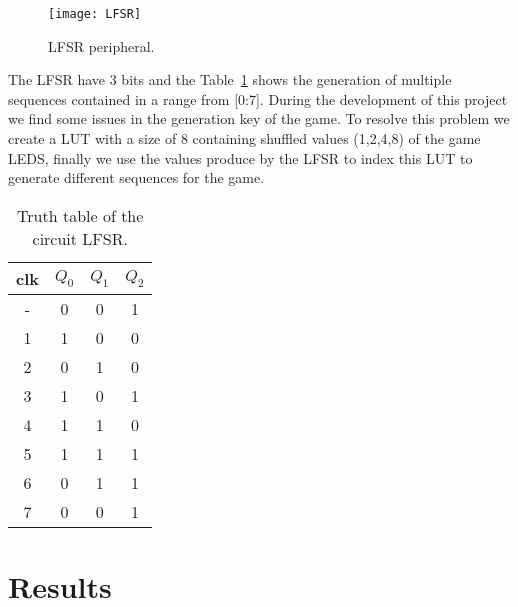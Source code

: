\vspace{10pt}
\begin{figure}[!htbp]
    \centerline{\texttt{[image: LFSR]}}
    \vspace{0cm}\caption{LFSR peripheral.}
    \label{fig:LFSR}
\end{figure}

\clearpage
\noindent The LFSR have 3 bits and the Table~\ref{tab:LFSR} shows the generation of multiple sequences contained in 
a range from [0:7]. During the development of this project we find some issues in the generation key of the game.
To resolve this problem we create a LUT with a size of 8 containing shuffled values (1,2,4,8) of the game LEDS,
finally we use the values produce by the LFSR to index this LUT to generate different sequences for the game.

\begin{table}[!htbp]
\centering
    \begin{tabular}{c|ccc}
        clk & $Q_0$ & $Q_1$ & $Q_2$ \\
        \hline
        - & 0 & 0 & 1 \\
        1 & 1 & 0 & 0 \\
        2 & 0 & 1 & 0 \\
        3 & 1 & 0 & 1 \\
        4 & 1 & 1 & 0 \\
        5 & 1 & 1 & 1 \\
        6 & 0 & 1 & 1 \\
        7 & 0 & 0 & 1 \\   
    \end{tabular}
    \caption{Truth table of the circuit LFSR.}
    \label{tab:LFSR}
\end{table} 

\section{Results}
\label{sec:results}

